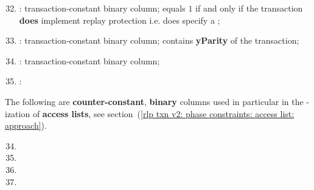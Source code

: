 \begin{enumerate}
	\setcounter{enumi}{31}
    \item 
	\rlpTxnCommonColumnReplayProtection{}:
	transaction-constant binary column;
	equals $1$ if and only if the transaction \textbf{does} implement replay protection i.e.
	does specify a \chainId{};
    \item
	\rlpTxnCommonColumnYparity{}:
	transaction-constant binary column;
	contains \textbf{yParity} of the transaction;
    \item
	\rlpTxnSharedColumnRequiresEvmExecution{}:
	transaction-constant binary column;
	\item
	\markAsJustifiedHere{}
	\rlpTxnSharedColumnIsDep{}:
\end{enumerate}
The following are \textbf{counter-constant}, \textbf{binary} columns used in particular in the \rlp{}-ization of \textbf{access lists},
see section~(\ref{rlp txn v2: phase constraints: access list: approach}).
\begin{multicols}{2}
    \begin{enumerate}[resume]
	    \setcounter{enumi}{33}
	\item \rlpTxnSharedColumnIsPrefixOfAccessListItem
	\item \rlpTxnSharedColumnIsPrefixOfStorageKeyList
	\item \rlpTxnSharedColumnIsAccessListAddress
	\item \rlpTxnSharedColumnIsAccessListStorageKey
    \end{enumerate}
\end{multicols}
